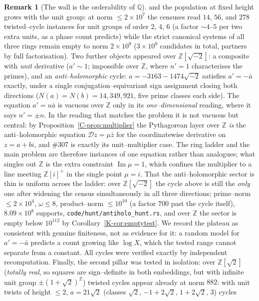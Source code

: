 \documentclass[11pt]{article}
\theoremstyle{definition}
\newtheorem{remark}[theorem]{Remark}
\begin{document}
\begin{remark}[The wall is the orderability of $\mathbb{Q}$]
and the population at fixed height grows with the unit group: at norm $\le2\times10^7$ the censuses
read $14$, $56$, and $278$ twisted--cycle instances for unit groups of order $2$, $4$, $6$ (a factor
${\sim}4$--$5$ per two extra units, as a phase count predicts) while the strict canonical systems of
all three rings remain empty to norm $2\times10^9$ ($3\times10^9$ candidates in total, partners by full
factorisation). Two further objects appeared over $\mathbb{Z}[\sqrt{-2}]$: a composite with \emph{unit}
derivative ($a'\sim1$; impossible over $\mathbb{Z}$, where $n'=1$ characterises the primes), and an
\emph{anti--holomorphic} cycle: $a=-3163-1474\sqrt{-2}$ satisfies $a'=-\bar a$ exactly, under a single
conjugation--equivariant sign assignment closing both directions ($N(a)=N(b)=14{,}349{,}921$, five prime
classes each side). The equation $a'=u\bar a$ is vacuous over $\mathbb{Z}$ only in its
\emph{one--dimensional} reading, where it says $n'=\pm n$. In the reading that matches the problem it is
not vacuous but central: by Proposition~\ref{C-prop:multiplier} the Pythagorean layer over $\mathbb{Z}$
\emph{is} the anti--holomorphic equation $\mathcal{D}z=\mu\bar z$ for the coordinatewise derivative on
$z=a+bi$, and \#307 is exactly its unit--multiplier case. The ring ladder and the main problem are
therefore instances of one equation rather than analogues; what singles out $\mathbb{Z}$ is the extra
constraint $\operatorname{Im}\mu=1$, which confines the multiplier to a line meeting
$\mathbb{Z}[i]^{\times}$ in the single point $\mu=i$. That the anti--holomorphic sector is thin is
uniform across the ladder: over $\mathbb{Z}[\sqrt{-2}]$ the cycle above is still the \emph{only} one
after widening the census simultaneously in all three directions; prime--norm $\le2\times10^4$,
$\omega\le8$, product--norm $\le10^{10}$ (a factor $700$ past the cycle itself), $8.09\times10^8$
supports, \texttt{code/hunt/antiholo\_hunt.rs}, and over
$\mathbb{Z}$ the sector is empty below $10^{112}$ by Corollary~\ref{K-cor:emptytest}. We record the
plateau as consistent with genuine finiteness, not as evidence for it: a random model for
$a'=-\bar a$ predicts a count growing like $\log X$, which the tested range cannot separate from a
constant. All cycles were verified exactly by independent recomputation. Finally, the second pillar was tested in isolation: over
$\mathbb{Z}[\sqrt2]$ (\emph{totally real}, so squares are sign--definite in both embeddings, but with
infinite unit group $\pm(1+\sqrt2)^{\mathbb{Z}}$) twisted cycles appear already at norm $882$: with
unit twists of height $\le2$, $a=21\sqrt2$ (classes $\sqrt2$, $-1+2\sqrt2$, $1+2\sqrt2$, $3$) cycles

\end{remark}
\end{document}
